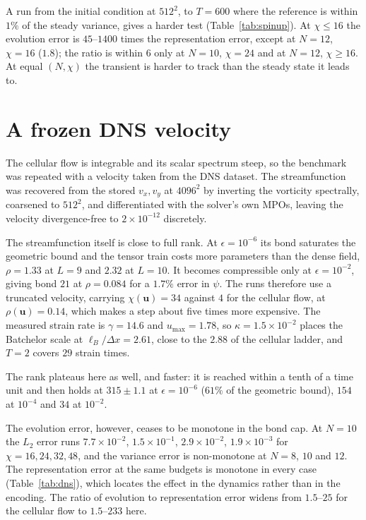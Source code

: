 \documentclass[aps,prfluids,reprint,onecolumn,amsmath,amssymb,nofootinbib,floatfix]{revtex4-2}
\begin{document}
A run from the initial condition at $512^2$, to $T=600$ where the reference is
within $1\%$ of the steady variance, gives a harder test
(Table~\ref{tab:spinup}). At $\chi\le16$ the evolution error is
$45$--$1400$ times the representation error, except at $N=12$, $\chi=16$
($1.8$); the ratio is within $6$ only at $N=10$, $\chi=24$ and at $N=12$,
$\chi\ge16$. At equal $(N,\chi)$ the transient is harder to track than the
steady state it leads to.

\begin{table}[h]
\centering
\footnotesize
\TabSpinup
\caption{Forced runs at $512^2$ from the usual initial condition to $T=600$:
relative $L_2$ error at $t=T$ and its ratio to the representation error.}
\label{tab:spinup}
\end{table}

\section{A frozen DNS velocity}
\label{sec:dns}

The cellular flow is integrable and its scalar spectrum steep, so the benchmark
was repeated with a velocity taken from the DNS dataset. The streamfunction was
recovered from the stored $v_x,v_y$ at $4096^2$ by inverting the vorticity
spectrally, coarsened to $512^2$, and differentiated with the solver's own MPOs,
leaving the velocity divergence-free to $2\times10^{-12}$ discretely.

The streamfunction itself is close to full rank. At $\epsilon=10^{-6}$ its bond
saturates the geometric bound and the tensor train costs more parameters than
the dense field, $\rho=1.33$ at $L=9$ and $2.32$ at $L=10$. It becomes
compressible only at $\epsilon=10^{-2}$, giving bond $21$ at $\rho=0.084$ for a
$1.7\%$ error in $\psi$. The runs therefore use a truncated velocity, carrying
$\chi(\mathbf{u})=34$ against $4$ for the cellular flow, at
$\rho(\mathbf{u})=0.14$, which makes a step about five times more expensive.
The measured strain rate is $\gamma=14.6$ and $u_{\max}=1.78$, so
$\kappa=1.5\times10^{-2}$ places the Batchelor scale at
$\ell_B/\Delta x=2.61$, close to the $2.88$ of the cellular ladder, and $T=2$
covers $29$ strain times.

The rank plateaus here as well, and faster: it is reached within a tenth of a
time unit and then holds at $315\pm1.1$ at $\epsilon=10^{-6}$ ($61\%$ of the
geometric bound), $154$ at $10^{-4}$ and $34$ at $10^{-2}$.

The evolution error, however, ceases to be monotone in the bond cap. At $N=10$
the $L_2$ error runs $7.7\times10^{-2}$, $1.5\times10^{-1}$,
$2.9\times10^{-2}$, $1.9\times10^{-3}$ for $\chi=16,24,32,48$, and the variance
error is non-monotone at $N=8$, $10$ and $12$. The representation error at the
same budgets is monotone in every case (Table~\ref{tab:dns}), which locates the
effect in the dynamics rather than in the encoding. The ratio of evolution to
representation error widens from $1.5$--$25$ for the cellular flow to
$1.5$--$233$ here.
\end{document}

